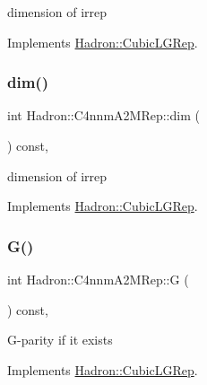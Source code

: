 dimension of irrep 

Implements \mbox{\hyperlink{structHadron_1_1CubicLGRep_a3acbaea26503ed64f20df693a48e4cdd}{Hadron\+::\+Cubic\+L\+G\+Rep}}.

\mbox{\label{structHadron_1_1C4nnmA2MRep_a5c3be88143a9c05ede78e8d988d21c52}} 
\subsubsection{\texorpdfstring{dim()}{dim()}\hspace{0.1cm}{\footnotesize\ttfamily [2/2]}}
{\footnotesize\ttfamily int Hadron\+::\+C4nnm\+A2\+M\+Rep\+::dim (\begin{DoxyParamCaption}{ }\end{DoxyParamCaption}) const\hspace{0.3cm}{\ttfamily [inline]}, {\ttfamily [virtual]}}

dimension of irrep 

Implements \mbox{\hyperlink{structHadron_1_1CubicLGRep_a3acbaea26503ed64f20df693a48e4cdd}{Hadron\+::\+Cubic\+L\+G\+Rep}}.

\mbox{\label{structHadron_1_1C4nnmA2MRep_a4a41dd35707514a4f23fe162a37918b4}} 
\subsubsection{\texorpdfstring{G()}{G()}\hspace{0.1cm}{\footnotesize\ttfamily [1/2]}}
{\footnotesize\ttfamily int Hadron\+::\+C4nnm\+A2\+M\+Rep\+::G (\begin{DoxyParamCaption}{ }\end{DoxyParamCaption}) const\hspace{0.3cm}{\ttfamily [inline]}, {\ttfamily [virtual]}}

G-\/parity if it exists 

Implements \mbox{\hyperlink{structHadron_1_1CubicLGRep_ace26f7b2d55e3a668a14cb9026da5231}{Hadron\+::\+Cubic\+L\+G\+Rep}}.

\mbox{\label{structHadron_1_1C4nnmA2MRep_a4a41dd35707514a4f23fe162a37918b4}} 
